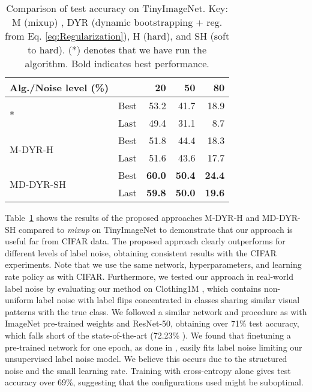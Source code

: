 \documentclass{article}
\providecommand{\tabularnewline}{\\}
\begin{document}
\begin{table}[t]
\begin{centering}
\caption{\label{tab:TinyImageNet}Comparison of test accuracy on TinyImageNet. Key: M (mixup) , DYR (dynamic bootstrapping + reg. from
Eq. \ref{eq:Regularization}), H (hard), and SH (soft to hard). ({*})
denotes that we have run the algorithm. Bold indicates best performance.}
\vskip 0.15in 
\par\end{centering}
\begin{centering}
\begin{small}\begin{tabular}{llrrr}
\toprule 
Alg./Noise level (\%) &  & 20 & 50 & 80\tabularnewline
\midrule 
\multirow{2}{*}{\cite{2018_ICLR_mixup}{*}} & Best & 53.2 & 41.7 & 18.9\tabularnewline
 & Last &  49.4 & 31.1 & 8.7\tabularnewline
\midrule 
\multirow{2}{*}{M-DYR-H} & Best & 51.8 & 44.4 & 18.3\tabularnewline
 & Last &  51.6 &  43.6 &  17.7\tabularnewline
\midrule 
\multirow{2}{*}{MD-DYR-SH} & Best & \textbf{60.0} & \textbf{50.4} & \textbf{24.4}\tabularnewline
 & Last & \textbf{ 59.8} & \textbf{ 50.0} & \textbf{ 19.6}\tabularnewline
\bottomrule 
\end{tabular}\end{small}
\par\end{centering}
\centering{}\vskip -0.1in 
\end{table}
Table~\ref{tab:TinyImageNet} shows the results of the proposed
approaches M-DYR-H and MD-DYR-SH compared to \emph{mixup} \cite{2018_ICLR_mixup}
on TinyImageNet to demonstrate that our approach is useful far from
CIFAR data. The proposed approach clearly outperforms \cite{2018_ICLR_mixup}
for different levels of label noise, obtaining consistent results
with the CIFAR experiments. Note that we use
the same network, hyperparameters, and learning rate policy as with CIFAR.
Furthermore, we tested our approach in real-world label noise
by evaluating our method on Clothing1M \cite{2015_CVPR_GraphModelNoise},
which contains non-uniform label noise with label flips concentrated
in classes sharing similar visual patterns with the true class. We
followed a similar network and procedure as \cite{2018_CVPR_JointOpt}
with ImageNet pre-trained weights and ResNet-50, obtaining over 71\%
test accuracy, which falls short of the state-of-the-art (72.23\%  \cite{2018_CVPR_JointOpt}). We found
that finetuning a pre-trained network for one epoch, as done in \cite{2018_CVPR_JointOpt},
easily fits label noise limiting our unsupervised label noise model. We believe this occurs
due to the structured noise and the small learning rate. Training with cross-entropy alone gives test accuracy over 69\%, suggesting that the configurations used might be suboptimal.
\end{document}
